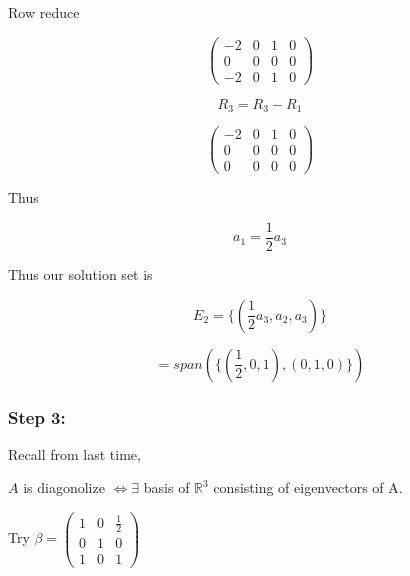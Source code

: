 \documentclass{article}
\newtheorem{one minute paper}[theorem]{One Minute Paper}
\begin{document}
Row reduce 

\begin{equation}
    \left(\begin{array}{ccc|c}
        -2 & 0 & 1 & 0\\
        0 & 0 & 0 & 0 \\
        -2 & 0 & 1 & 0
    \end{array}\right)
\end{equation}

\begin{equation}
    R_3 = R_3 - R_1
\end{equation}

\begin{equation}
    \left(\begin{array}{ccc|c}
        -2 & 0 & 1 & 0\\
        0 & 0 & 0 & 0 \\
        0 & 0 & 0 & 0
    \end{array}\right)
\end{equation}

Thus 

\begin{equation}
    a_1 = \frac{1}{2}a_3
\end{equation}

Thus our solution set is 

\begin{equation}
    E_2 = \{(\frac{1}{2}a_3, a_2, a_3)\}
\end{equation}

\begin{equation}
    = span(\{(\frac{1}{2}, 0 , 1), (0,1,0)\})
\end{equation}

\subsubsection*{Step 3:}

Recall from last time, 
\begin{center}
    $A$ is diagonolize $\iff \exists$ basis of $\mathbb{R}^3$ consisting of eigenvectors of A.  
\end{center}

\begin{center}
    Try $\beta = \begin{pmatrix}
        1 & 0 & \frac{1}{2} \\
        0 & 1 & 0 \\
        1 & 0 & 1
    \end{pmatrix}$
\end{center}
\end{document}

